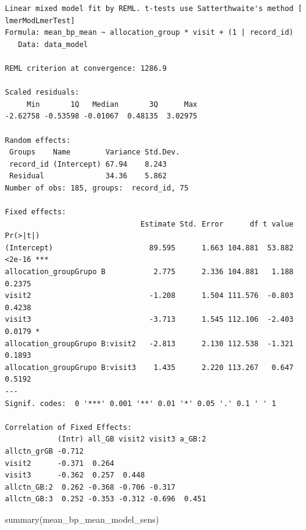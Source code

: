 \documentclass[
  letterpaper,
  DIV=11,
  numbers=noendperiod]{scrartcl}
\newenvironment{Shaded}{\begin{snugshade}}{\end{snugshade}}
\newcommand{\FunctionTok}[1]{\textcolor[rgb]{0.28,0.35,0.67}{#1}}
\newcommand{\NormalTok}[1]{\textcolor[rgb]{0.00,0.23,0.31}{#1}}
\begin{document}
\begin{verbatim}
Linear mixed model fit by REML. t-tests use Satterthwaite's method [
lmerModLmerTest]
Formula: mean_bp_mean ~ allocation_group * visit + (1 | record_id)
   Data: data_model

REML criterion at convergence: 1286.9

Scaled residuals: 
     Min       1Q   Median       3Q      Max 
-2.62758 -0.53598 -0.01067  0.48135  3.02975 

Random effects:
 Groups    Name        Variance Std.Dev.
 record_id (Intercept) 67.94    8.243   
 Residual              34.36    5.862   
Number of obs: 185, groups:  record_id, 75

Fixed effects:
                               Estimate Std. Error      df t value Pr(>|t|)    
(Intercept)                      89.595      1.663 104.881  53.882   <2e-16 ***
allocation_groupGrupo B           2.775      2.336 104.881   1.188   0.2375    
visit2                           -1.208      1.504 111.576  -0.803   0.4238    
visit3                           -3.713      1.545 112.106  -2.403   0.0179 *  
allocation_groupGrupo B:visit2   -2.813      2.130 112.538  -1.321   0.1893    
allocation_groupGrupo B:visit3    1.435      2.220 113.267   0.647   0.5192    
---
Signif. codes:  0 '***' 0.001 '**' 0.01 '*' 0.05 '.' 0.1 ' ' 1

Correlation of Fixed Effects:
            (Intr) all_GB visit2 visit3 a_GB:2
allctn_grGB -0.712                            
visit2      -0.371  0.264                     
visit3      -0.362  0.257  0.448              
allctn_GB:2  0.262 -0.368 -0.706 -0.317       
allctn_GB:3  0.252 -0.353 -0.312 -0.696  0.451
\end{verbatim}

\begin{Shaded}
\begin{Highlighting}[]
\FunctionTok{summary}\NormalTok{(mean\_bp\_mean\_model\_sens)}
\end{Highlighting}
\end{Shaded}
\end{document}
